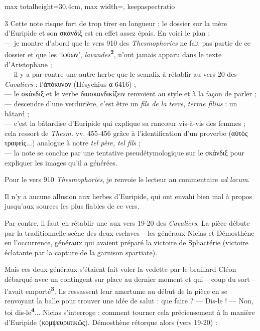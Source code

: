\documentclass[11pt,twoside]{book}
\newcommand{\italique}[1]{\textit{#1}}
\newcommand{\latin}[1]{\textit{#1}}
\newcommand{\marqueur}[1]{\textsuperscript{\color{rubricRed}\textbf{#1}}}
\begin{document}
\begin{adjustbox}{max totalheight=30.4cm, max width=\textwidth, keepaspectratio}
\begin{minipage}{\textwidth}
{\begin{multicols}{3}
\noindent Cette note risque fort de trop tirer en longueur ; le dossier sur la mère d'Euripide et son σκάνδιξ est en effet assez épais. En voici le plan :\\ --- je montre d'abord que le vers 910 des \italique{Thesmophories} ne fait pas partie de ce dossier et que les `ἰφύων', \italique{lavandes}\marqueur{2}, n'ont jamais apparu dans le texte d'Aristophane ;\\ --- il y a par contre une autre herbe que le scandix à rétablir au vers 20 des \italique{Cavaliers} : l'ἀπόκυνον (Hésychius α 6416) ;\\ --- le σκάνδιξ et le verbe διασκανδικίζειν renvoient au style et à la façon de parler ;\\ --- descendre d'une verdurière, c'est être un \italique{fils de la terre}, \latin{terrae filius} : un bâtard ;\\ --- c'est la bâtardise d'Euripide qui explique sa rancœur vis-à-vis des femmes ; cela ressort de \italique{Thesm.} vv. 455-456 grâce à l'identification d'un proverbe (αὐτὸς τραφείς...) analogue à notre \italique{tel père, tel fils} ;\\ --- la note se conclue par une tentative pseudétymologique sur le σκάνδιξ pour expliquer les images qu'il a générées.
\par\vspace{1.5pt}
\noindent Pour le vers 910 \italique{Thesmophories}, je renvoie le lecteur au commentaire \italique{ad locum}.
\par\vspace{1.5pt}
\noindent Il n'y a aucune allusion aux herbes d'Euripide, qui ont envahi bien mal à propos jusqu'aux sources les plus fiables de ce vers.
\par\vspace{1.5pt}
\noindent Par contre, il faut en rétablir une aux vers 19-20 des \italique{Cavaliers}. La pièce débute par la traditionnelle scène des deux esclaves -- les généraux Nicias et Démosthène en l'occurrence, généraux qui avaient préparé la victoire de Sphactérie (victoire éclatante par la capture de la garnison spartiate).
\par\vspace{1.5pt}
\noindent Mais ces deux généraux s'étaient fait voler la vedette par le braillard Cléon débarqué avec un contingent sur place au dernier moment et qui – coup du sort – l'avait emporté\marqueur{3}. Ils ressassent leur amertume au début de la pièce en se renvoyant la balle pour trouver une idée de salut : que faire ? — Dis-le ! — Non, toi dis-le\marqueur{4}... Nicias s'interroge : comment tourner cela précieusement à la manière d'Euripide (κομψευριπικῶς). Démosthène rétorque alors (vers 19-20) :

\end{multicols}}
\end{minipage}
\end{adjustbox}
\end{document}
